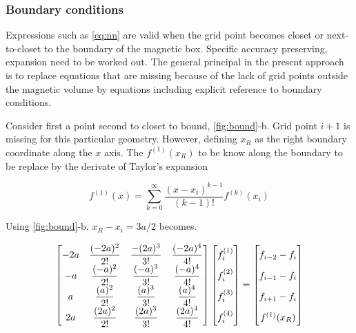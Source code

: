 \subsubsection{Boundary conditions}

Expressions such as \ref{eq:nn} are valid when the grid point becomes closet or next-to-closet to the boundary of the magnetic box. Specific accuracy preserving, expansion need to be worked out. The general principal in the present approach is to replace equations that are missing because of the lack of grid points outside the magnetic volume by equations including explicit reference to boundary conditions. \cite{methods}

Consider first a point second to closet to bound, \ref{fig:bound}-b. Grid point $i + 1$ is missing for this particular geometry. However, defining $x_R$ as the right boundary coordinate along the $x$ axis. The $f^{(1)}(x_R)$ to be know along the boundary to be replace by the derivate of Taylor's expansion

\begin{equation} \label{eq:taylor}
f^{(1)}(x) = \sum\limits_{k=0}^{\infty} \dfrac{(x-x_i)^{k-1}}{(k - 1)!}f^{(k)}(x_i)
\end{equation}

Using \ref{fig:bound}-b. $x_R - x_i = 3a/2$ becomes.

\begin{align}
\begin{bmatrix} \label{eq:matrix4}
    -2a & \dfrac{(-2a)^2}{2!} & \dfrac{-(2a)^3}{3!} & \dfrac{(-2a)^4}{4!}\\
    -a & \dfrac{(-a)^2}{2!} & \dfrac{(-a)^3}{3!} & \dfrac{(-a)^4}{4!}\\
    a & \dfrac{(a)^2}{2!} & \dfrac{(a)^3}{3!} & \dfrac{(a)^4}{4!}\\
    2a & \dfrac{(2a)^2}{2!} & \dfrac{(2a)^3}{3!} & \dfrac{(2a)^4}{4!}
\end{bmatrix}
\begin{bmatrix}
    f_i^{(1)}  \vphantom{ \dfrac{d^4}{d} }\\
    f_i^{(2)}  \vphantom{ \dfrac{d^4}{d} } \\
    f_i^{(3)}  \vphantom{ \dfrac{d^4}{d} } \\
    f_i^{(4)}  \vphantom{ \dfrac{d^4}{d} }
\end{bmatrix}
=
\begin{bmatrix}
    f_{i-2} - f_{i}    \vphantom{ \dfrac{d^4}{d}} \\
    f_{i-1} - f_{i}    \vphantom{ \dfrac{d^4}{d}} \\
    f_{i+1} - f_{i}    \vphantom{ \dfrac{d^4}{d}} \\
    f^{(1)}(x_R)   \vphantom{ \dfrac{d^4}{d}}
\end{bmatrix}
\end{align}

